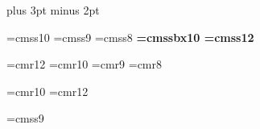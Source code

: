 \textheight 10.90in
\textwidth 7.95in
\parskip 8pt plus 3pt minus 2pt
\parindent 0in
\pagestyle{empty}


\font\sf=cmss10
\font\small=cmss9
\font\tiny=cmss8
\font\bf=cmssbx10
\font\large=cmss12

\font\frL=cmr12
\font\frn=cmr10
\font\frs=cmr9
\font\frt=cmr8

\font\ajfrn=cmr10
\font\ajfrL=cmr12


\font\ajinpfont=cmss9

\newcommand{\ajnull}{\makebox[0.05in]{\phantom{a}}}




\newcommand{\atiny}{\tiny \setlength{\baselineskip}{2.0mm}}

\newcommand{\ajubox}[1]{\raisebox{0.045in}{\phantom{M}\hspace*{-1.0em}
                          \rule[-0.05in]{0.3pt}{0.05in}
                          \hspace*{-1.1mm}\rule[-0.05in]{#1}{0.3pt}
                          \hspace*{-1.1mm}\rule[-0.05in]{0.3pt}{0.05in}}}

\newcommand{\ajudot}[1]{\phantom{M}\hspace*{-1.0em}\parbox[b]{#1}{
                          {.}\dotfill{.}}}

\newcommand{\tline}{\rule[0.0cm]{18.5cm}{0.7mm}}

\newcommand{\fbt}[1]{\hspace*{#1}\raisebox{0.045in}{\atiny
                     \framebox[0.15in][c]{\ajnull}}}

\newcommand{\ajyn}{\large \setlength{\baselineskip}{2.3mm} Y/N}

\newcommand{\ajy}{\hspace*{0.19in}\rule[0.02in]{0.09in}{0.08in}}

\newcommand{\ajn}{\rule[0.02in]{0.09in}{0.08in}}

\newcommand{\ajyesno}{YES/NO}

\newcommand{\ajyes}{\hspace*{0.31in}\rule[0.02in]{0.13in}{0.06in}}

